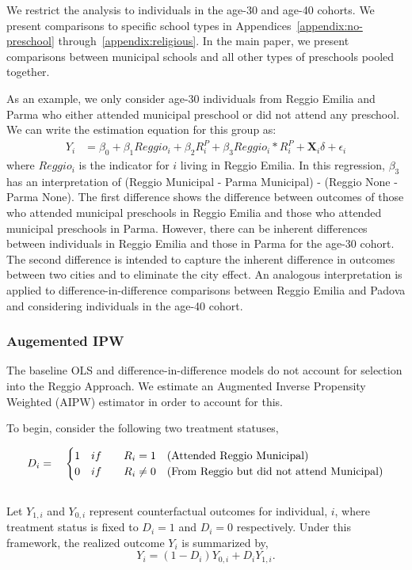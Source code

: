 We restrict the analysis to individuals in the age-30 and age-40 cohorts. We present comparisons to specific school types in Appendices~\ref{appendix:no-preschool} through~\ref{appendix:religious}. In the main paper, we present comparisons between municipal schools and all other types of preschools pooled together.

As an example, we only consider age-30 individuals from Reggio Emilia and Parma who either attended municipal preschool or did not attend any preschool. We can write the estimation equation for this group as:
\begin{eqnarray}  \label{eq:specific2}
Y_i & = \beta_0 + \beta_1 Reggio_i + \beta_2 R_i^P + \beta_3 Reggio_i * R_i^P + \bm{X}_i\delta + \epsilon_i 
\end{eqnarray}
where $Reggio_i$ is the indicator for $i$ living in Reggio Emilia. In this regression, $\beta_3$ has an interpretation of (Reggio Municipal - Parma Municipal) - (Reggio None - Parma None). The first difference shows the difference between outcomes of those who attended municipal preschools in Reggio Emilia and those who attended municipal preschools in Parma. However, there can be inherent differences between individuals in Reggio Emilia and those in Parma for the age-30 cohort. The second difference is intended to capture the inherent difference in outcomes between two cities and to eliminate the city effect. An analogous interpretation is applied to difference-in-difference comparisons between Reggio Emilia and Padova and considering individuals in the age-40 cohort. 


\subsubsection{Augemented IPW}

The baseline OLS and difference-in-difference models do not account for selection into the Reggio Approach. We estimate an Augmented Inverse Propensity Weighted (AIPW) estimator in order to account for this.   

To begin, consider the following two treatment statuses,

\begin{equation}\label{eq:cases-d}
D_i = \quad
\begin{cases}
1 \quad if \quad &  R_i = 1\text{\quad 		(Attended Reggio Municipal)} \\
0 \quad if \quad &  R_i \neq 0 \text{\quad 	(From Reggio but did not attend Municipal)} \\
\end{cases}
\end{equation}
~\\
Let $Y_{1,i}$ and $Y_{0,i}$ represent counterfactual outcomes for individual, $i$, where treatment status is fixed to $D_i=1$ and $D_i=0$ respectively. Under this framework, the realized outcome $Y_i$ is summarized by,
\begin{equation}\label{eq:roy}
Y_i = (1-D_i)Y_{0,i} + D_iY_{1,i}.
\end{equation}

